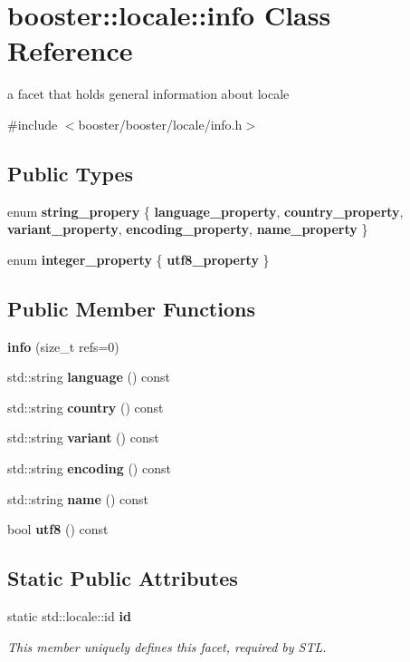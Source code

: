\section{booster\-:\-:locale\-:\-:info \-Class \-Reference}
\label{classbooster_1_1locale_1_1info}


a facet that holds general information about locale  




{\ttfamily \#include $<$booster/booster/locale/info.\-h$>$}

\subsection*{\-Public \-Types}
\begin{DoxyCompactItemize}
\item 
enum {\bf string\-\_\-propery} \{ \*
{\bf language\-\_\-property}, 
{\bf country\-\_\-property}, 
{\bf variant\-\_\-property}, 
{\bf encoding\-\_\-property}, 
\*
{\bf name\-\_\-property}
 \}
\item 
enum {\bf integer\-\_\-property} \{ {\bf utf8\-\_\-property}
 \}
\end{DoxyCompactItemize}
\subsection*{\-Public \-Member \-Functions}
\begin{DoxyCompactItemize}
\item 
{\bf info} (size\-\_\-t refs=0)
\item 
std\-::string {\bf language} () const 
\item 
std\-::string {\bf country} () const 
\item 
std\-::string {\bf variant} () const 
\item 
std\-::string {\bf encoding} () const 
\item 
std\-::string {\bf name} () const 
\item 
bool {\bf utf8} () const 
\end{DoxyCompactItemize}
\subsection*{\-Static \-Public \-Attributes}
\begin{DoxyCompactItemize}
\item 
static std\-::locale\-::id {\bf id}\label{classbooster_1_1locale_1_1info_aa3300572409ad20043a3ad629aa761df}

\begin{DoxyCompactList}\small\item\em \-This member uniquely defines this facet, required by \-S\-T\-L. \end{DoxyCompactList}\end{DoxyCompactItemize}
